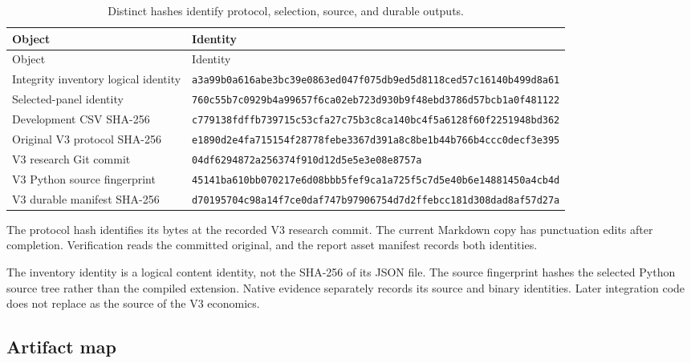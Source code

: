 \begin{longtable}{@{}L{0.28\textwidth}L{0.67\textwidth}@{}}
\caption{Distinct hashes identify protocol, selection, source, and durable outputs.}\\
\toprule
Object & Identity \\
\midrule
\endfirsthead
\toprule
Object & Identity \\
\midrule
\endhead
\bottomrule
\endfoot
Integrity inventory logical identity & \nolinkurl{a3a99b0a616abe3bc39e0863ed047f075db9ed5d8118ced57c16140b499d8a61} \\
Selected-panel identity & \nolinkurl{760c55b7c0929b4a99657f6ca02eb723d930b9f48ebd3786d57bcb1a0f481122} \\
Development CSV SHA-256 & \nolinkurl{c779138fdffb739715c53cfa27c75b3c8ca140bc4f5a6128f60f2251948bd362} \\
Original V3 protocol SHA-256 & \nolinkurl{e1890d2e4fa715154f28778febe3367d391a8c8be1b44b766b4ccc0decf3e395} \\
V3 research Git commit & \nolinkurl{04df6294872a256374f910d12d5e5e3e08e8757a} \\
V3 Python source fingerprint & \nolinkurl{45141ba610bb070217e6d08bbb5fef9ca1a725f5c7d5e40b6e14881450a4cb4d} \\
V3 durable manifest SHA-256 & \nolinkurl{d70195704c98a14f7ce0daf747b97906754d7d2ffebcc181d308dad8af57d27a} \\
\end{longtable}

The protocol hash identifies its bytes at the recorded V3 research commit.
The current Markdown copy has punctuation edits after completion. Verification
reads the committed original, and the report asset manifest records both
identities.

The inventory identity is a logical content identity, not the SHA-256 of its
JSON file. The source fingerprint hashes the selected Python source tree
rather than the compiled extension. Native evidence separately records its
source and binary identities. Later integration code does not replace
\ResearchCommit{} as the source of the V3 economics.

\subsection{Artifact map}

